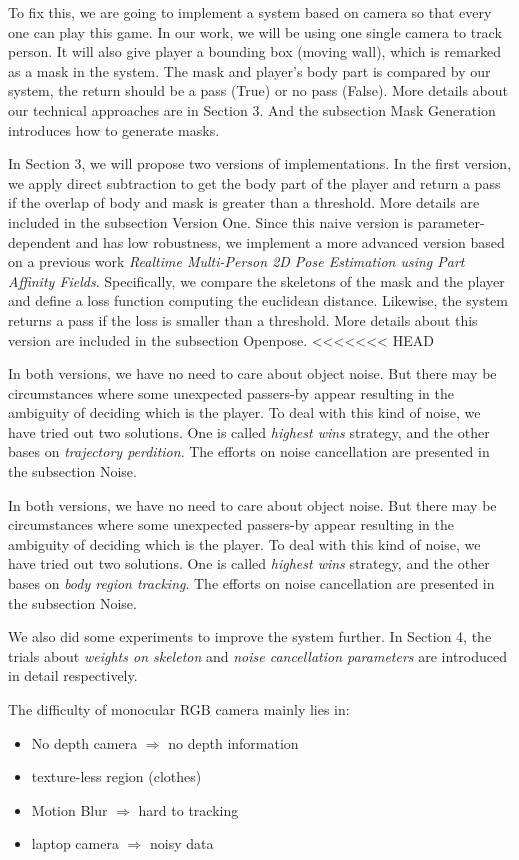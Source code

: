 \documentclass[11pt,twocolumn,letterpaper]{article}
\begin{document}
    \par To fix this, we are going to implement a system based on camera so that every one can play this game.
        In our work, we will be using one single camera to track person. It will also give player a bounding box (moving wall), which is remarked as a mask in the system.
        The mask and player's body part is compared by our system, the return should be a pass (True) or no pass (False). More details about our technical approaches are in Section 3. And the subsection Mask Generation introduces how to generate masks.
    \par In Section 3, we will propose two versions of implementations. In the first version, we apply direct subtraction to get the body part of the player and return a pass if the overlap of body and mask is greater than a threshold. More details are included in the subsection Version One. Since this naive version is parameter-dependent and has low robustness, we implement a more advanced version based on a previous work \textit{Realtime Multi-Person 2D Pose Estimation using Part Affinity Fields}\cite{cao2017realtime}. Specifically, we compare the skeletons of the mask and the player and define a loss function computing the euclidean distance. Likewise, the system returns a pass if the loss is smaller than a threshold. More details about this version are included in the subsection Openpose.
<<<<<<< HEAD
    \par In both versions, we have no need to care about object noise. But there may be circumstances where some unexpected passers-by appear resulting in the ambiguity of deciding which is the player. To deal with this kind of noise, we have tried out two solutions. One is called \emph{highest wins} strategy, and the other bases on \emph{trajectory perdition}. The efforts on noise cancellation are presented in the subsection Noise.

    \par In both versions, we have no need to care about object noise. But there may be circumstances where some unexpected passers-by appear resulting in the ambiguity of deciding which is the player. To deal with this kind of noise, we have tried out two solutions. One is called \emph{highest wins} strategy, and the other bases on \emph{body region tracking}. The efforts on noise cancellation are presented in the subsection Noise.

    \par We also did some experiments to improve the system further. In Section 4, the trials about \emph{weights on skeleton} and \emph{noise cancellation parameters} are introduced in detail respectively.
    \par
    The difficulty of monocular RGB camera mainly lies in:
    \begin{itemize}
    \item No depth camera $\Rightarrow$ no depth information
    \item texture-less region (clothes)
    \item Motion Blur $\Rightarrow$ hard to tracking
    \item laptop camera $\Rightarrow$ noisy data
    \end{itemize}
\end{document}
